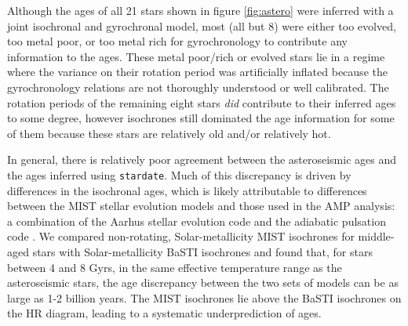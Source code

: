\documentclass[useAMS, usenatbib, preprint, 12pt]{aastex}
\newcommand{\sd}{{\tt stardate}}
\newcommand{\racomment}[1]{{\bf #1}}
\begin{document}
Although the ages of all 21 stars shown in figure \ref{fig:astero} were
inferred with a joint isochronal and gyrochronal model, most (all but 8) were
either too evolved, too metal poor, or too metal rich for gyrochronology to
contribute any information to the ages.
These metal poor/rich or evolved stars lie in a regime where the variance on
their rotation period was artificially inflated because the gyrochronology
relations are not thoroughly understood or well calibrated.
The rotation periods of the remaining eight stars {\it did} contribute to
their inferred ages to some degree, however isochrones still dominated the age
information for some of them because these stars are relatively old and/or
relatively hot.

In general, there is relatively poor agreement between the asteroseismic ages
and the ages inferred using \sd.
Much of this discrepancy is driven by differences in the isochronal ages,
which is likely attributable to differences between the MIST stellar evolution
models and those used in the AMP analysis: a combination of the Aarhus stellar
evolution code \citep[ASTEC][]{christensen-dalsgaard2008a} and the adiabatic
pulsation code \citep[ADIPLS][]{christensen-dalsgaard2008b}.
We compared non-rotating, Solar-metallicity MIST isochrones for middle-aged
stars with Solar-metallicity BaSTI isochrones \citep{pietrinferni2004,
hidalgo2018} and found that, for stars between 4 and 8 Gyrs, in the same
effective temperature range as the asteroseismic stars, the age discrepancy
between the two sets of models can be as large as 1-2 billion years.
The MIST isochrones lie above the BaSTI isochrones on the HR diagram, leading
to a systematic underprediction of ages.
\end{document}
